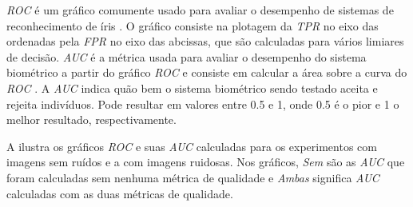 \par \textit{\acrshort{ROC}} é um gráfico comumente usado para avaliar o desempenho de sistemas de reconhecimento de íris \cite{aucROC, daugman2000}. O gráfico consiste na plotagem da \textit{\acrshort{TPR}} no eixo das ordenadas pela \textit{\acrshort{FPR}} no eixo das abcissas, que são calculadas para vários limiares de decisão. \textit{\acrshort{AUC}} é a métrica usada para avaliar o desempenho do sistema biométrico a partir do gráfico \textit{\acrshort{ROC}} e consiste em calcular a área sobre a curva do \textit{\acrshort{ROC}} \cite{aucROC}. A \textit{\acrshort{AUC}} indica quão bem o sistema biométrico sendo testado aceita e rejeita indivíduos. Pode resultar em valores entre 0.5 e 1, onde 0.5 é o pior e 1 o melhor resultado, respectivamente.

\par A  ilustra os gráficos \textit{\acrshort{ROC}} e suas \textit{\acrshort{AUC}} calculadas para os experimentos com imagens sem ruídos e a  com imagens ruidosas. Nos gráficos, \textit{Sem} são as \textit{\acrshort{AUC}} que foram calculadas sem nenhuma métrica de qualidade e \textit{Ambas} significa \textit{\acrshort{AUC}} calculadas com as duas métricas de qualidade.

